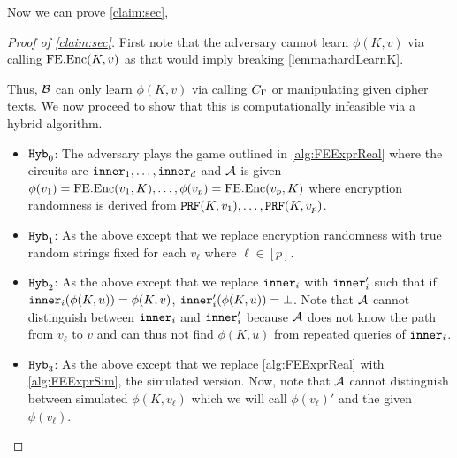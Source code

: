 Now we can prove \cref{claim:sec},
\begin{proof}[Proof of \cref{claim:sec}]
First note that the adversary cannot learn $\phi(K, v)$ via calling $\text{FE.Enc}(K, v)$ as
that would imply breaking \cref{lemma:hardLearnK}.

Thus, $\mathcal{B}$ can only learn $\phi(K, v)$ via calling $C_\Gamma$ or manipulating given cipher texts.
We now proceed to show that this is computationally infeasible via a hybrid algorithm.

\begin{itemize}
	\item $\texttt{Hyb}_0$: The adversary plays the game outlined in \cref{alg:FEExprReal} where the circuits are $\texttt{inner}_1, \dots, \texttt{inner}_d$
	and $\mathcal{A}$ is given $\phi(v_1) = \text{FE.Enc}(v_1, K), \dots, \phi(v_p) = \text{FE.Enc}(v_p, K)$ where encryption randomness is derived from $\texttt{PRF}(K, v_1), \dots, \texttt{PRF}(K, v_p)$.
	\item $\texttt{Hyb}_1$: As the above except that we replace encryption randomness with true random strings fixed for each $v_\ell$ where $\ell \in [p]$.
	\item $\texttt{Hyb}_2$: As the above except that we replace $\texttt{inner}_i$ with $\texttt{inner}_i'$ such that if $\texttt{inner}_i(\phi(K, u)) = \phi(K, v)$,
	$\texttt{inner}_i'(\phi(K, u)) = \bot$.
	Note that $\mathcal{A}$ cannot distinguish between $\texttt{inner}_i$ and $\texttt{inner}_i'$ because $\mathcal{A}$ does not know the path from $v_\ell$ to $v$
	and can thus not find $\phi(K, u)$ from repeated queries of $\texttt{inner}_i$.
	\item $\texttt{Hyb}_3$: As the above except that we replace \cref{alg:FEExprReal} with \cref{alg:FEExprSim}, the simulated version.
	Now, note that $\mathcal{A}$ cannot distinguish between simulated $\phi(K, v_\ell)$ which we will call $\phi(v_\ell)'$ and the given $\phi(v_\ell)$.
\end{itemize}


\end{proof}
